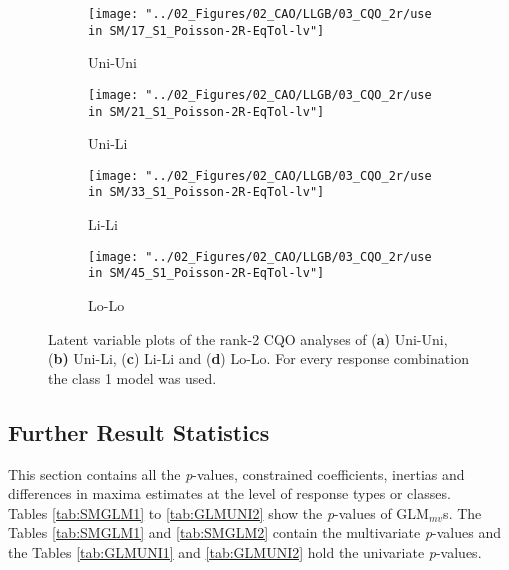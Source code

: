 		\begin{figure}[h!]
			
			\begin{subfigure}{.50\textwidth}		
				\centering
				\texttt{[image: "../02\_Figures/02\_CAO/LLGB/03\_CQO\_2r/use in SM/17\_S1\_Poisson-2R-EqTol-lv"]}
				\caption{Uni-Uni}
			\end{subfigure}
			\begin{subfigure}{.5\textwidth}
				\centering		
				\texttt{[image: "../02\_Figures/02\_CAO/LLGB/03\_CQO\_2r/use in SM/21\_S1\_Poisson-2R-EqTol-lv"]}
				\caption{Uni-Li}
			\end{subfigure}
			\begin{subfigure}{.5\textwidth}	
				\centering	
				\texttt{[image: "../02\_Figures/02\_CAO/LLGB/03\_CQO\_2r/use in SM/33\_S1\_Poisson-2R-EqTol-lv"]}
				\caption{Li-Li}
			\end{subfigure}
			\begin{subfigure}{.5\textwidth}		
				\centering
				\texttt{[image: "../02\_Figures/02\_CAO/LLGB/03\_CQO\_2r/use in SM/45\_S1\_Poisson-2R-EqTol-lv"]}
				\caption{Lo-Lo}
			\end{subfigure}
			
			\caption{Latent variable plots of the rank-2 CQO analyses of (\textbf{a}) Uni-Uni, (\textbf{b)} Uni-Li, (\textbf{c}) Li-Li and (\textbf{d}) Lo-Lo. For every response combination the class 1 model was used.}
			\label{fig:smcqoord}
			
		\end{figure}

		\newpage
		
	\subsection{Further Result Statistics}	
	
		This section contains all the \textit{p}-values, constrained coefficients, inertias and differences in maxima estimates at the level of response types or classes.\\
		Tables \ref{tab:SMGLM1} to \ref{tab:GLMUNI2} show the \textit{p}-values of GLM$_{mv}$s. 
		The Tables \ref{tab:SMGLM1} and \ref{tab:SMGLM2} contain the multivariate \textit{p}-values and the Tables \ref{tab:GLMUNI1} and \ref{tab:GLMUNI2} hold the univariate \textit{p}-values.
	
